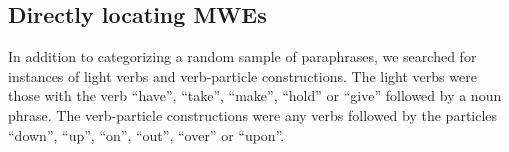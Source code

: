 \documentclass[11pt]{article}
\begin{document}
%
%
%


\subsection{Directly locating MWEs}

In addition to categorizing a random sample of paraphrases, we searched for instances of light verbs and verb-particle constructions. The light verbs were those with the verb ``have'', ``take'', ``make'', ``hold'' or ``give'' followed by a noun phrase. The verb-particle constructions were any verbs followed by the particles ``down'', ``up'', ``on'', ``out'', ``over'' or ``upon''. 
\end{document}
